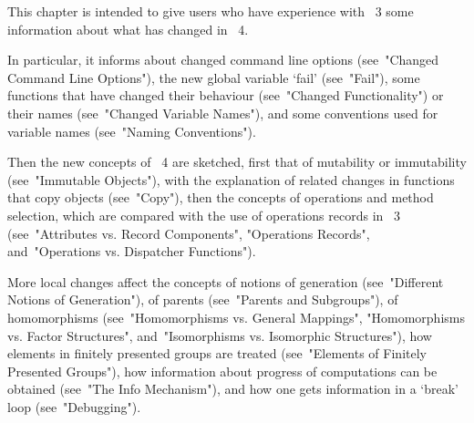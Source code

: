 
\TableOfContents
\FrontMatter

\Chapters


This chapter is intended to give users who have experience with {\GAP}~3
some information about what has changed in {\GAP}~4.

In particular, it informs about changed command line options
(see~"Changed Command Line Options"),
the new global variable `fail' (see~"Fail"),
some functions that have changed their behaviour
(see~"Changed Functionality") or their names
(see~"Changed Variable Names"),
and some conventions used for variable names (see~"Naming Conventions").

Then the new concepts of {\GAP}~4 are sketched,
first that of mutability or immutability (see~"Immutable Objects"),
with the explanation of related changes in functions that copy objects
(see~"Copy"),
then the concepts of operations and method selection, which are compared
with the use of operations records in {\GAP}~3
(see~"Attributes vs. Record Components", "Operations Records",
and~"Operations vs. Dispatcher Functions").

More local changes affect the concepts of notions of generation
(see~"Different Notions of Generation"),
of parents (see~"Parents and Subgroups"),
of homomorphisms (see~"Homomorphisms vs. General Mappings",
"Homomorphisms vs. Factor Structures",
and~"Isomorphisms vs. Isomorphic Structures"),
how elements in finitely presented groups are treated
(see~"Elements of Finitely Presented Groups"),
how information about progress of computations can be obtained
(see~"The Info Mechanism"),
and how one gets information in a `break' loop
(see~"Debugging").

